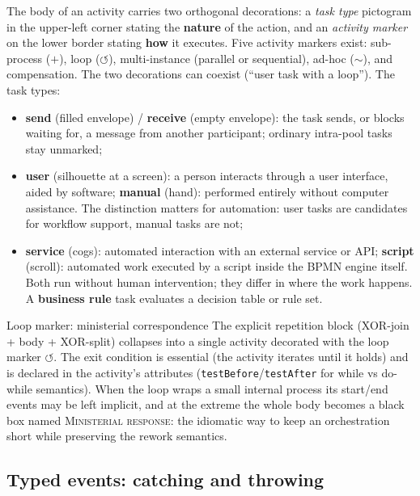 The body of an activity carries two orthogonal decorations: a \emph{task type} pictogram in the upper-left corner stating the \textbf{nature} of the action, and an \emph{activity marker} on the lower border stating \textbf{how} it executes. Five activity markers exist: sub-process ($+$), loop ($\circlearrowleft$), multi-instance (parallel or sequential), ad-hoc ($\sim$), and compensation. The two decorations can coexist (``user task with a loop''). The task types:
\begin{itemize}
  \item \textbf{send} (filled envelope) / \textbf{receive} (empty envelope): the task sends, or blocks waiting for, a message from another participant; ordinary intra-pool tasks stay unmarked;
  \item \textbf{user} (silhouette at a screen): a person interacts through a user interface, aided by software; \textbf{manual} (hand): performed entirely without computer assistance. The distinction matters for automation: user tasks are candidates for workflow support, manual tasks are not;
  \item \textbf{service} (cogs): automated interaction with an external service or API; \textbf{script} (scroll): automated work executed by a script inside the BPMN engine itself. Both run without human intervention; they differ in where the work happens. A \textbf{business rule} task evaluates a decision table or rule set.
\end{itemize}

\begin{examplebox}{Loop marker: ministerial correspondence}
The explicit repetition block (XOR-join + body + XOR-split) collapses into a single activity decorated with the loop marker $\circlearrowleft$. The exit condition is essential (the activity iterates until it holds) and is declared in the activity's attributes (\texttt{testBefore}/\texttt{testAfter} for while vs do-while semantics). When the loop wraps a small internal process its start/end events may be left implicit, and at the extreme the whole body becomes a black box named \textsc{Ministerial response}: the idiomatic way to keep an orchestration short while preserving the rework semantics.
\end{examplebox}

\subsection{Typed events: catching and throwing}

